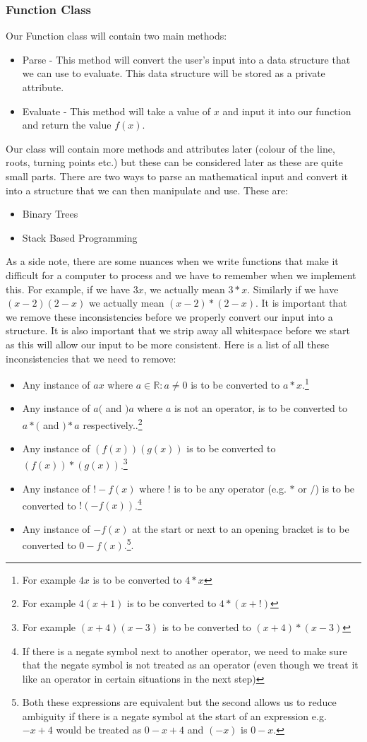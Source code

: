 \documentclass{article}
\begin{document}
\subsubsection{Function Class}	\label{funcClass}
Our Function class will contain two main methods:
\begin{itemize}
	\item Parse - This method will convert the user's input into a data structure that we can use to evaluate. This data structure will be stored as a private attribute.
	\item Evaluate - This method will take a value of $x$ and input it into our function and return the value $f(x)$.
\end{itemize}
Our class will contain more methods and attributes later (colour of the line, roots, turning points etc.) but these can be considered later as these are quite small parts.
There are two ways to parse an mathematical input and convert it into a structure that we can then manipulate and use. These are:
\begin{itemize}
	\item Binary Trees
	\item Stack Based Programming
\end{itemize}
As a side note, there are some nuances when we write functions that make it difficult for a computer to process and we have to remember when we implement this. For example, if we have $3x$, we actually mean $3*x$. Similarly if we have $(x-2)(2-x)$ we actually mean $(x-2)*(2-x)$. It is important that we remove these inconsistencies before we properly convert our input into a structure. It is also important that we strip away all whitespace before we start as this will allow our input to be more consistent. Here is a list of all these inconsistencies that we need to remove:
\begin{itemize}
	\item Any instance of $ax$ where $a \in  \mathbb{R} : a \neq 0$ is to be converted to $a*x$.\footnote{For example $4x$ is to be converted to $4*x$}
	\item Any instance of $a($ and $)a$ where $a$ is not an operator, is to be converted to $a*($ and $)*a$ respectively..\footnote{For example $4(x+1)$ is to be converted to $4*(x+!)$}
	\item Any instance of $(f(x))(g(x))$ is to be converted to $(f(x))*(g(x))$.\footnote{For example $(x+4)(x-3)$ is to be converted to $(x+4)*(x-3)$}
	\item Any instance of $!-f(x)$ where $!$ is to be any operator (e.g. $*$ or $/$) is to be converted to $! (-f(x))$.\footnote{If there is a negate symbol next to another operator, we need to make sure that the negate symbol is not treated as an operator (even though we treat it like an operator in certain situations in the next step)}
	\item Any instance of $-f(x)$ at the start or next to an opening bracket is to be converted to $0 - f(x)$.\footnote{Both these expressions are equivalent but the second allows us to reduce ambiguity if there is a negate symbol at the start of an expression e.g.\ $-x + 4$ would be treated as $0 - x + 4$ and $(-x)$ is $0-x$.}.
\end{itemize}
\newpage
\end{document}
